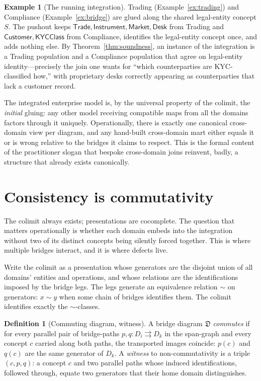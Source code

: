 \documentclass[11pt]{article}
\theoremstyle{plain}
\theoremstyle{definition}
\newtheorem{definition}{Definition}
\newtheorem{example}{Example}
\newcommand{\Trade}{\mathsf{Trade}}
\newcommand{\Inst}{\mathsf{Instrument}}
\newcommand{\Cust}{\mathsf{Customer}}
\begin{document}
\begin{example}[The running integration]\label{ex:running}
Trading (Example~\ref{ex:trading}) and Compliance (Example~\ref{ex:bridge}) are glued along the shared legal-entity concept $S$. The pushout keeps $\Trade,\Inst,\mathsf{Market},\mathsf{Desk}$ from Trading and $\Cust,\mathsf{KYCClass}$ from Compliance, identifies the legal-entity concept once, and adds nothing else. By Theorem~\ref{thm:soundness}, an instance of the integration is a Trading population and a Compliance population that agree on legal-entity identity---precisely the join one wants for ``which counterparties are KYC-classified how,'' with proprietary desks correctly appearing as counterparties that lack a customer record.
\end{example}

The integrated enterprise model is, by the universal property of the colimit, the \emph{initial} gluing: any other model receiving compatible maps from all the domains factors through it uniquely. Operationally, there is exactly one canonical cross-domain view per diagram, and any hand-built cross-domain mart either equals it or is wrong relative to the bridges it claims to respect. This is the formal content of the practitioner slogan that bespoke cross-domain joins reinvent, badly, a structure that already exists canonically.

\section{Consistency is commutativity}\label{sec:commute}

The colimit always exists; presentations are cocomplete. The question that matters operationally is whether each domain embeds into the integration without two of its distinct concepts being silently forced together. This is where multiple bridges interact, and it is where defects live.

Write the colimit as a presentation whose generators are the disjoint union of all domains' entities and operations, and whose relations are the identifications imposed by the bridge legs. The legs generate an equivalence relation $\sim$ on generators: $x \sim y$ when some chain of bridges identifies them. The colimit identifies exactly the $\sim$-classes.

\begin{definition}[Commuting diagram, witness]
A bridge diagram $\mathfrak{D}$ \emph{commutes} if for every parallel pair of bridge-paths $p,q\colon D_i \rightrightarrows D_k$ in the span-graph and every concept $c$ carried along both paths, the transported images coincide: $p(c)$ and $q(c)$ are the same generator of $D_k$. A \emph{witness} to non-commutativity is a triple $(c,p,q)$: a concept $c$ and two parallel paths whose induced identifications, followed through, equate two generators that their home domain distinguishes.
\end{definition}
\end{document}
